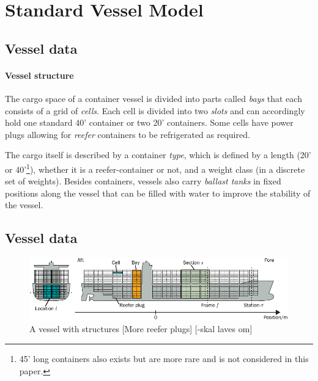 


\section{Standard Vessel Model}


\subsection*{Vessel data}
\paragraph{Vessel structure}
The cargo space of a container vessel is divided into parts called \textit{bays} that each consists of a grid of \emph{cells}. Each cell is divided into two \emph{slots} and can accordingly hold one standard 40' container or two 20' containers. Some cells have power plugs allowing for \emph{reefer} containers to be refrigerated as required. 

The cargo itself is described by a container \emph{type}, which is defined by a length (20' or 40'\footnote{45' long containers also exists but are more rare and is not considered in this paper.}), whether it is a reefer-container or not, and a weight class (in a discrete set of weights). 
Besides containers, vessels also carry \emph{ballast tanks} in fixed positions along the vessel that can be filled with water to improve the stability of the vessel.


\subsection*{Vessel data}
\begin{figure}
	\centering
		\includegraphics{figures/vessel.pdf}
	\caption{A vessel with structures [More reefer plugs] [-skal laves om]}
	\label{fig:vessel}
\end{figure}

